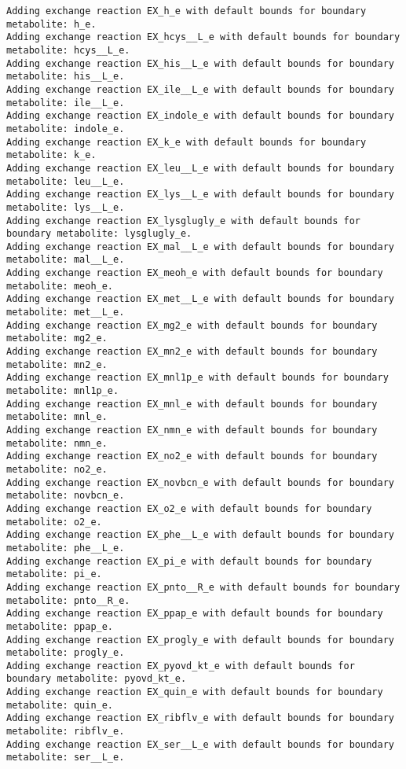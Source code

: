 \documentclass[
  letterpaper,
  DIV=11,
  numbers=noendperiod]{scrartcl}
\begin{document}
\begin{verbatim}
Adding exchange reaction EX_h_e with default bounds for boundary metabolite: h_e.
Adding exchange reaction EX_hcys__L_e with default bounds for boundary metabolite: hcys__L_e.
Adding exchange reaction EX_his__L_e with default bounds for boundary metabolite: his__L_e.
Adding exchange reaction EX_ile__L_e with default bounds for boundary metabolite: ile__L_e.
Adding exchange reaction EX_indole_e with default bounds for boundary metabolite: indole_e.
Adding exchange reaction EX_k_e with default bounds for boundary metabolite: k_e.
Adding exchange reaction EX_leu__L_e with default bounds for boundary metabolite: leu__L_e.
Adding exchange reaction EX_lys__L_e with default bounds for boundary metabolite: lys__L_e.
Adding exchange reaction EX_lysglugly_e with default bounds for boundary metabolite: lysglugly_e.
Adding exchange reaction EX_mal__L_e with default bounds for boundary metabolite: mal__L_e.
Adding exchange reaction EX_meoh_e with default bounds for boundary metabolite: meoh_e.
Adding exchange reaction EX_met__L_e with default bounds for boundary metabolite: met__L_e.
Adding exchange reaction EX_mg2_e with default bounds for boundary metabolite: mg2_e.
Adding exchange reaction EX_mn2_e with default bounds for boundary metabolite: mn2_e.
Adding exchange reaction EX_mnl1p_e with default bounds for boundary metabolite: mnl1p_e.
Adding exchange reaction EX_mnl_e with default bounds for boundary metabolite: mnl_e.
Adding exchange reaction EX_nmn_e with default bounds for boundary metabolite: nmn_e.
Adding exchange reaction EX_no2_e with default bounds for boundary metabolite: no2_e.
Adding exchange reaction EX_novbcn_e with default bounds for boundary metabolite: novbcn_e.
Adding exchange reaction EX_o2_e with default bounds for boundary metabolite: o2_e.
Adding exchange reaction EX_phe__L_e with default bounds for boundary metabolite: phe__L_e.
Adding exchange reaction EX_pi_e with default bounds for boundary metabolite: pi_e.
Adding exchange reaction EX_pnto__R_e with default bounds for boundary metabolite: pnto__R_e.
Adding exchange reaction EX_ppap_e with default bounds for boundary metabolite: ppap_e.
Adding exchange reaction EX_progly_e with default bounds for boundary metabolite: progly_e.
Adding exchange reaction EX_pyovd_kt_e with default bounds for boundary metabolite: pyovd_kt_e.
Adding exchange reaction EX_quin_e with default bounds for boundary metabolite: quin_e.
Adding exchange reaction EX_ribflv_e with default bounds for boundary metabolite: ribflv_e.
Adding exchange reaction EX_ser__L_e with default bounds for boundary metabolite: ser__L_e.

\end{verbatim}
\end{document}

